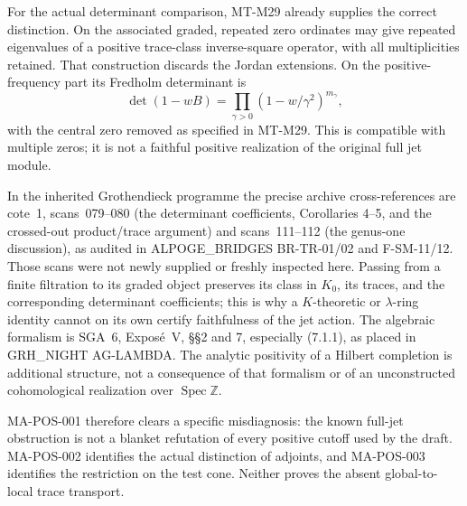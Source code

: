 For the actual determinant comparison, MT-M29 already supplies
the correct distinction. On the associated graded, repeated
zero ordinates may give repeated eigenvalues of a positive
trace-class inverse-square operator, with all multiplicities
retained. That construction discards the Jordan extensions. On
the positive-frequency part its Fredholm determinant is
\[
 \det(1-wB)=\prod_{\gamma>0}
              (1-w/\gamma^2)^{m_\gamma},
\]
with the central zero removed as specified in MT-M29.
This is compatible with multiple zeros; it is not a faithful
positive realization of the original full jet module.

In the inherited Grothendieck programme the precise archive
cross-references are cote~1, scans~079--080 (the determinant
coefficients, Corollaries 4--5, and the crossed-out product/trace
argument) and scans~111--112 (the genus-one discussion), as
audited in ALPOGE\_BRIDGES BR-TR-01/02 and F-SM-11/12.
Those scans were not newly supplied or freshly inspected here.
Passing from a finite filtration to its graded object preserves
its class in $K_0$, its traces, and the corresponding determinant
coefficients; this is why a $K$-theoretic or $\lambda$-ring
identity cannot on its own certify faithfulness of the jet action.
The algebraic formalism is SGA~6, Expos\'e~V, \S\S2 and 7,
especially (7.1.1), as placed in GRH\_NIGHT AG-LAMBDA.
The analytic positivity of a Hilbert completion is additional
structure, not a consequence of that formalism or of an
unconstructed cohomological realization over
$\operatorname{Spec}\mathbb Z$.

MA-POS-001 therefore clears a specific misdiagnosis: the known
full-jet obstruction is not a blanket refutation of every
positive cutoff used by the draft. MA-POS-002 identifies the
actual distinction of adjoints, and MA-POS-003 identifies the
restriction on the test cone. Neither proves the absent
global-to-local trace transport.
